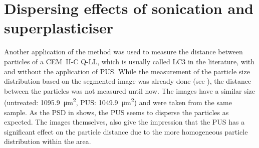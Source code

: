 \section{Dispersing effects of sonication and superplasticiser}

Another application of the method was used to measure the distance between particles of a CEM~II-C Q-LL, which is usually called \ac{LC3} in the literature, with and without the application of \ac{PUS}.
While the measurement of the particle size distribution based on the segmented image was already done \cite{rossler.2023,rossler.2023a} (see ), the distance between the particles was not measured until now.
The images have a similar size (untreated: \qty{1095.9}{\micro\meter\squared}, \ac{PUS}: \qty{1049.9}{\micro\meter\squared}) and were taken from the same sample.
As the \ac{PSD} in  shows, the \ac{PUS} seems to disperse the particles as expected.
The images themselves, also give the impression that the \ac{PUS} has a significant effect on the particle distance due to the more homogeneous particle distribution within the area.

